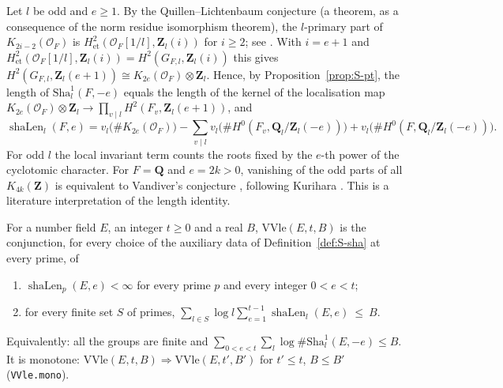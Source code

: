 \begin{remark}\label{rem:S-ktheory}
Let $l$ be odd and $e\ge 1$. By the Quillen--Lichtenbaum conjecture (a theorem, as a consequence of the
norm residue isomorphism theorem), the $l$-primary part of $K_{2i-2}(\mathcal{O}_F)$ is
$H^2_{\mathrm{et}}(\mathcal{O}_F[1/l],\mathbf{Z}_l(i))$ for $i\ge 2$; see \cite[Theorem 70 and the proof of Theorem 77]{S-Weibel}.
With $i=e+1$ and $H^2_{\mathrm{et}}(\mathcal{O}_F[1/l],\mathbf{Z}_l(i))=H^2(G_{F,l},\mathbf{Z}_l(i))$ this gives
$H^2(G_{F,l},\mathbf{Z}_l(e+1))\cong K_{2e}(\mathcal{O}_F)\otimes\mathbf{Z}_l$. Hence, by Proposition~\ref{prop:S-pt},
the length of $\mathrm{Sha}^1_l(F,-e)$ equals the length of the kernel of the localisation map
$K_{2e}(\mathcal{O}_F)\otimes\mathbf{Z}_l\to\prod_{v\mid l}H^2(F_v,\mathbf{Z}_l(e+1))$, and
\[
  \operatorname{shaLen}_l(F,e)=v_l\bigl(\#K_{2e}(\mathcal{O}_F)\bigr)-\sum_{v\mid l}v_l\bigl(\#H^0(F_v,\mathbf{Q}_l/\mathbf{Z}_l(-e))\bigr)
     +v_l\bigl(\#H^0(F,\mathbf{Q}_l/\mathbf{Z}_l(-e))\bigr).
\]
For odd $l$ the local invariant term counts the roots fixed by the $e$-th power of the
cyclotomic character. For $F=\mathbf Q$ and $e=2k>0$, vanishing of the odd parts of all
$K_{4k}(\mathbf Z)$ is equivalent to Vandiver's conjecture \cite[Theorem 105]{S-Weibel}, following Kurihara \cite{S-Kurihara}.
This is a literature interpretation of the length identity.
\end{remark}

\begin{definition}\label{def:S-vvle}
For a number field $E$, an integer $t\ge 0$ and a real $B$, $\mathrm{VVle}(E,t,B)$ is the conjunction, for
every choice of the auxiliary data of Definition~\ref{def:S-sha} at every prime, of
\begin{enumerate}
\item $\operatorname{shaLen}_p(E,e)<\infty$ for every prime $p$ and every integer $0<e<t$;
\item for every finite set $S$ of primes,
$\displaystyle\sum_{l\in S}\log l\sum_{e=1}^{t-1}\operatorname{shaLen}_l(E,e)\ \le\ B .$
\end{enumerate}
Equivalently: all the groups are finite and $\sum_{0<e<t}\sum_l\log\#\mathrm{Sha}^1_l(E,-e)\le B$.
It is monotone: $\mathrm{VVle}(E,t,B)\Rightarrow\mathrm{VVle}(E,t',B')$ for $t'\le t$, $B\le B'$
(\texttt{VVle.mono}).
\end{definition}

